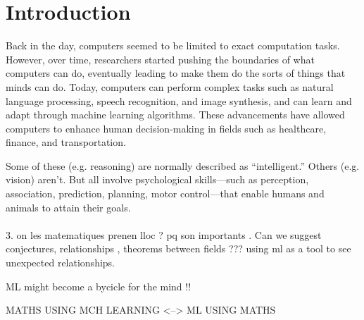 \documentclass[../main.tex]{subfiles}
\begin{document}
    \chapter{Introduction} \label{ch:intro}
    


\noindent Back in the day, computers seemed to be limited to exact computation tasks. However, over time, researchers started pushing the boundaries of what computers can do, eventually leading to make them do the sorts of things that minds can do. Today, computers can perform complex tasks such as natural language processing, speech recognition, and image synthesis, and can learn and adapt through machine learning algorithms. These advancements have allowed computers to enhance human decision-making in fields such as healthcare, finance, and transportation.


    
    
    Some of these (e.g. reasoning) are normally described as “intelligent.” Others (e.g. vision) aren’t. But all involve psychological
    skills—such as perception, association, prediction, planning, motor
    control—that enable humans and animals to attain their goals. \\ \\
    
    3. on les matematiques prenen lloc ? pq son importants .  Can we suggest conjectures, relationships , theorems between fields ??? using ml as a tool to see unexpected relationships. 
    
    ML might become a bycicle for the mind !!
    
    MATHS USING MCH LEARNING <--> ML USING MATHS  
    
   
\end{document}
